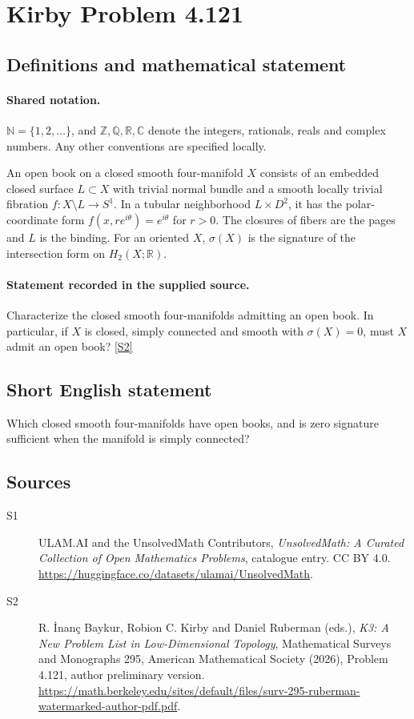 \documentclass[11pt]{article}
\newcommand{\sref}[2]{\hyperlink{source:#1:#2}{[S#2]}}
\begin{document}
\section{Kirby Problem 4.121}\label{statement}

\subsection{Definitions and mathematical statement}

\paragraph{Shared notation.}$\mathbb N=\{1,2,\ldots\}$, and $\mathbb Z,\mathbb Q,\mathbb R,\mathbb C$ denote the integers, rationals, reals and complex numbers. Any other conventions are specified locally.


An open book on a closed smooth four-manifold $X$ consists of an embedded closed surface $L\subset X$ with trivial normal bundle and a smooth locally trivial fibration $f:X\setminus L\to S^1$. In a tubular neighborhood $L\times D^2$, it has the polar-coordinate form $f(x,re^{i\theta})=e^{i\theta}$ for $r>0$. The closures of fibers are the pages and $L$ is the binding. For an oriented $X$, $\sigma(X)$ is the signature of the intersection form on $H_2(X;\mathbb R)$.
\paragraph{Statement recorded in the supplied source.}
Characterize the closed smooth four-manifolds admitting an open book. In particular, if $X$ is closed, simply connected and smooth with $\sigma(X)=0$, must $X$ admit an open book? \sref{statement}{2}
\subsection{Short English statement}
Which closed smooth four-manifolds have open books, and is zero signature sufficient when the manifold is simply connected?
\subsection{Sources}
\begin{description}
\item[\hypertarget{source:statement:1}{S1}] ULAM.AI and the UnsolvedMath Contributors, \emph{UnsolvedMath: A Curated Collection of Open Mathematics Problems}, catalogue entry. CC BY 4.0. \url{https://huggingface.co/datasets/ulamai/UnsolvedMath}.
\item[\hypertarget{source:statement:2}{S2}] R. İnanç Baykur, Robion C. Kirby and Daniel Ruberman (eds.), \emph{K3: A New Problem List in Low-Dimensional Topology}, Mathematical Surveys and Monographs 295, American Mathematical Society (2026), Problem 4.121, author preliminary version. \url{https://math.berkeley.edu/sites/default/files/surv-295-ruberman-watermarked-author-pdf.pdf}.
\end{description}
\label{end:statement}
\end{document}
